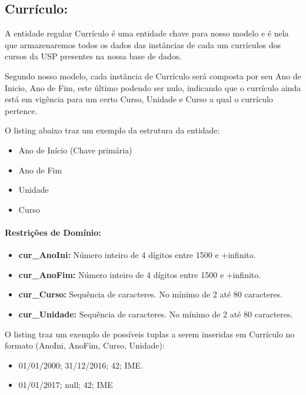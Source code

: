 \documentclass{report}
\begin{document}
\subsection{Currículo:}
A entidade regular Currículo é uma entidade chave para nosso modelo e é nela que armazenaremos todos os dados das instâncias de cada um currículos dos cursos da USP presentes na nossa base de dados.
	
	Segundo nosso modelo, cada instância de Currículo será composta por seu Ano de Inicio, Ano de Fim, este último podendo ser nulo, indicando que o currículo ainda está em vigência para um certo Curso, Unidade e Curso a qual o currículo pertence.
		
	O listing abaixo traz um exemplo da estrutura da entidade:
\begin{itemize}
  \item Ano de Início (Chave primária)
   \item Ano de Fim
   \item Unidade
   \item Curso
\end{itemize}
\paragraph{Restrições de Domínio:}
\begin{itemize}
  \item \textbf{cur\_AnoIni:} Número inteiro de 4 dígitos entre 1500 e +infinito.
   \item \textbf{cur\_AnoFim:} Número inteiro de 4 dígitos entre 1500 e +infinito.
   \item \textbf{cur\_Curso:} Sequência de caracteres. No mínimo de 2 até 80 caracteres.
   \item \textbf{cur\_Unidade:} Sequência de caracteres. No mínimo de 2 até 80 caracteres.
\end{itemize}
O listing traz um exemplo de possíveis tuplas a serem inseridas em Currículo no formato (AnoIni, AnoFim, Curso, Unidade):

\begin{itemize}
	\item 01/01/2000; 31/12/2016; 42; IME. 
	\item 01/01/2017; null; 42; IME
\end{itemize}
\iffalse
\end{document}
